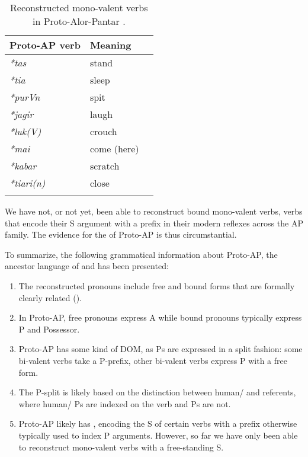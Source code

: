 \documentclass[output=paper]{LSP/langsci}
\begin{document}
\begin{table}[t]
\caption{Reconstructed mono-valent verbs in Proto-Alor-Pantar \citep{Holtonetal2012Historical,Holtonetal2017Internal,Schapperetal2017Relatedness,Klamerforthcoming}.}
\begin{tabularx}{.5\textwidth}{ Q Q Q }
\lsptoprule

\textbf{Proto-AP verb} & \textbf{Meaning} \\\midrule
\textit{*tas} & stand \\
\textit{*tia}& sleep\\
\textit{*purVn}& spit\\
\textit{*jagir}& laugh\\
\textit{*luk(V)} & crouch\\
\textit{*mai} & come (here)\\
\textit{*kabar}& scratch\\
\textit{*tiari(n)} & close\\

\lspbottomrule
\end{tabularx}
\label{03-kl-tab:3}
\end{table}

We have not, or not yet, been able to reconstruct bound mono-valent verbs, \ie verbs that encode their S argument with a prefix in their modern reflexes across the AP family. The evidence for the  of Proto-AP is thus circumstantial. 

To summarize, the following grammatical information about Proto-AP, the ancestor language of  and  has been presented:

\begin{enumerate}
\item The reconstructed pronouns include free and bound forms that are formally clearly related (\cf {}). 
\item In Proto-AP, free pronouns express A while bound pronouns typically express P and Possessor. 
\item Proto-AP has some kind of DOM, as Ps are expressed in a split fashion: some bi-valent verbs take a P-prefix, other bi-valent verbs express P with a free form. 
\item The P-split is likely based on the distinction between human/ and  referents, where human/ Ps are indexed on the verb and  Ps are not. 
\item Proto-AP likely has , encoding the S of certain  verbs with a prefix otherwise typically used to index P arguments. However, so far we have only been able to reconstruct mono-valent verbs with a free-standing S.
\end{enumerate}
\end{document}
